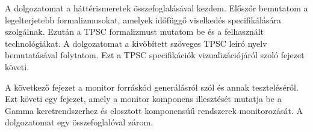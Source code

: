 A dolgozatomat a háttérismeretek összefoglalásával kezdem.
Előszőr bemutatom a legelterjetebb formalizmusokat, amelyek időfüggő viselkedés specifikálására szolgálnak.
Ezután a TPSC formalizmust mutatom be és a felhasznált technológiákat.
A dolgozatomat a kivőbített szöveges TPSC leíró nyelv bemutatásával folytatom.
Ezt a TPSC specifikációk vizualizációjáról szoló fejezet követi.

A következő fejezet a monitor forráskód generálásról szól és annak teszteléséről.
Ezt követi egy fejezet, amely a monitor komponens illesztését mutatja be a Gamma keretrendszerhez és elosztott komponensúű rendszerek monitorozását.
A dolgozatomat egy összefoglalóval zárom.